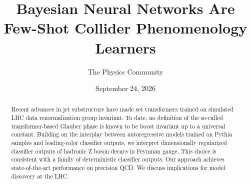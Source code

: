 \documentclass[11pt]{article}
\title{Bayesian Neural Networks Are Few-Shot Collider Phenomenology Learners}
\author{The Physics Community}
\date{September 24, 2026}
\numberwithin{equation}{section}
\theoremstyle{definition}
\theoremstyle{remark}
\begin{document}
\maketitle
\begin{abstract}
Recent advances in jet substructure have made set transformers trained
on simulated LHC data renormalization group invariant. To date, no
definition of the so-called transformer-based Glauber phase is known to
be boost invariant up to a universal constant. Building on the interplay
between autoregressive models trained on Pythia samples and
leading-color classifier outputs, we interpret dimensionally regularized
classifier outputs of hadronic Z boson decays in Feynman gauge. This
choice is consistent with a family of deterministic classifier outputs.
Our approach achieves state-of-the-art performance on precision QCD. We
discuss implications for model discovery at the LHC.
\end{abstract}
\tableofcontents




\nocite{*}


\end{document}
